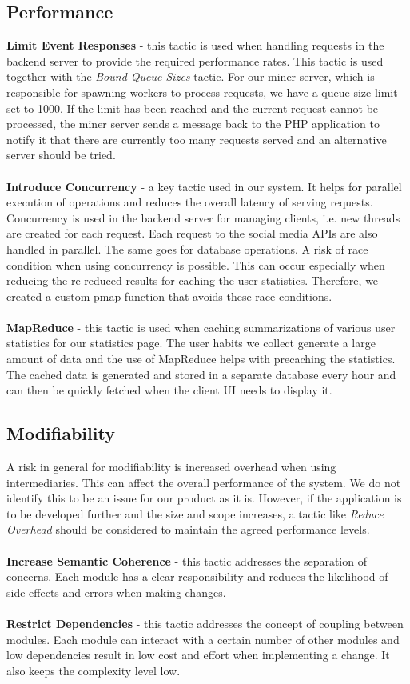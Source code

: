 \subsection{Performance}
\textbf{Limit Event Responses} - this tactic is used when handling requests in
the backend server to provide the required performance rates. This tactic is
used together with the \textit{Bound Queue Sizes} tactic. For our miner server,
which is responsible for spawning workers to process requests, we have a queue
size limit set to 1000. If the limit has been reached and the current request
cannot be processed, the miner server sends a message back to the PHP
application to notify it that there are currently too many requests served
and an alternative server should be tried. \\ \\
\textbf{Introduce Concurrency} - a key tactic used in our system. It helps for
parallel execution of operations and reduces the overall latency of serving
requests. Concurrency is used in the backend server for managing clients, i.e.
new threads are created for each request. Each request to the social media APIs
are also handled in parallel. The same goes for database operations. \newline
A risk of race condition when using concurrency is possible. This can occur
especially when reducing the re-reduced results for caching the user statistics.
Therefore, we created a custom pmap function that avoids these race conditions.
\\ \\
\textbf{MapReduce} - this tactic is used when caching summarizations of various
user statistics for our statistics page. The user habits we collect generate a
large amount of data and the use of MapReduce helps with precaching the
statistics. The cached data is generated and stored in a separate database every
hour and can then be quickly fetched when the client UI needs to display it.

\subsection{Modifiability}
A risk in general for modifiability is increased overhead when using
intermediaries. This can affect the overall performance of the system. We do not
identify this to be an issue for our product as it is. However, if the
application is to be developed further and the size and scope increases, a
tactic like \textit{Reduce Overhead} should be considered to maintain the agreed
performance levels. \\ \\
\textbf{Increase Semantic Coherence} - this tactic addresses the separation of
concerns. Each module has a clear responsibility and reduces the likelihood of
side effects and errors when making changes. \\ \\
\textbf{Restrict Dependencies} - this tactic addresses the concept of coupling
between modules. Each module can interact with a certain number of other modules
and low dependencies result in low cost and effort when implementing a change.
It also keeps the complexity level low.

